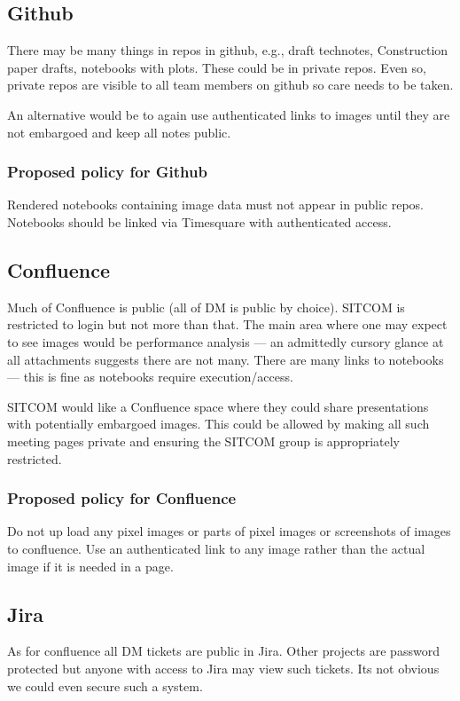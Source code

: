 \subsection{Github}
There may be many things in repos in github, e.g., draft technotes, Construction paper drafts, notebooks with plots.
These could be in private repos.
Even so, private repos are visible to all team members on github so care needs to be taken.

An alternative would be to again use authenticated links to images until they are not embargoed and keep all notes public.

\subsubsection{Proposed policy for Github}
Rendered notebooks containing image data must not appear in public repos.
Notebooks should be linked via Timesquare with authenticated access.

\subsection{Confluence}
Much of Confluence is public (all of DM is public by choice).
SITCOM is restricted to login but not more than that.
The main area where one may expect to see images would be performance analysis --- an admittedly cursory glance at all attachments suggests there are not many.
There are many links to notebooks --- this is fine as notebooks require execution/access.

SITCOM would like a Confluence space where they could share presentations with potentially embargoed images.
This could be allowed by making all such meeting pages private and ensuring the SITCOM group is appropriately restricted.

\subsubsection{Proposed policy for Confluence}
Do not up load any pixel images or parts of pixel images or screenshots of images to confluence.
Use an authenticated link to any image rather than the actual image if it is needed in a page.

\subsection{Jira}
As for confluence all DM tickets are public in Jira.
Other projects are password protected but anyone with access to Jira may view such tickets.
Its not obvious we could even secure such a system.

